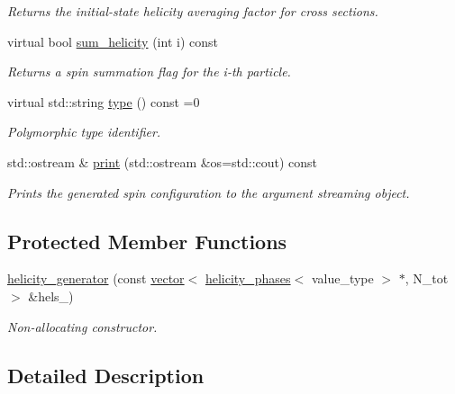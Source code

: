 \begin{DoxyCompactItemize}
\begin{DoxyCompactList}\small\item\em Returns the initial-\/state helicity averaging factor for cross sections. \end{DoxyCompactList}\item 
virtual bool \hyperlink{a00272_a5f9ad2e7ec5147c174578f659434cefa}{sum\+\_\+helicity} (int i) const 
\begin{DoxyCompactList}\small\item\em Returns a spin summation flag for the i-\/th particle. \end{DoxyCompactList}\item 
\hypertarget{a00272_af336a7c7169989fb48adc1e6587c8b15}{}virtual std\+::string \hyperlink{a00272_af336a7c7169989fb48adc1e6587c8b15}{type} () const =0\label{a00272_af336a7c7169989fb48adc1e6587c8b15}

\begin{DoxyCompactList}\small\item\em Polymorphic type identifier. \end{DoxyCompactList}\item 
std\+::ostream \& \hyperlink{a00272_a5939b444b5d8ffdca9c3ec5ccf059dc9}{print} (std\+::ostream \&os=std\+::cout) const 
\begin{DoxyCompactList}\small\item\em Prints the generated spin configuration to the argument streaming object. \end{DoxyCompactList}\end{DoxyCompactItemize}
\subsection*{Protected Member Functions}
\begin{DoxyCompactItemize}
\item 
\hyperlink{a00272_ab88ea2c915c7352fe7cb80178d8ef4a6}{helicity\+\_\+generator} (const \hyperlink{a00579}{vector}$<$ \hyperlink{a00275}{helicity\+\_\+phases}$<$ value\+\_\+type $>$ $\ast$, N\+\_\+tot $>$ \&hels\+\_\+)
\begin{DoxyCompactList}\small\item\em Non-\/allocating constructor. \end{DoxyCompactList}\end{DoxyCompactItemize}


\subsection{Detailed Description}
